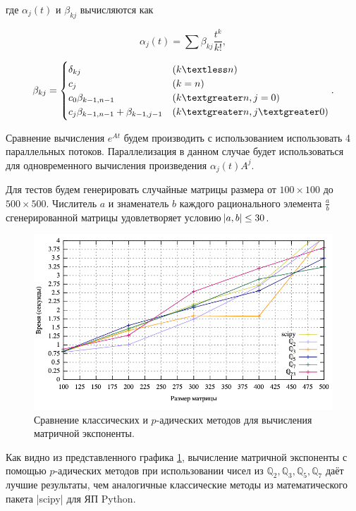 \documentclass[master, och, diploma, times]{sty/SCWorks}
\theoremstyle{plain}
\theoremstyle{definition}
\numberwithin{equation}{section}
\begin{document}
\noindent где $\alpha_{j}(t)$ и $\beta_{kj}$ вычисляются как

\begin{equation}
\alpha_{j}(t)=\sum \beta_{kj} \frac{t^k}{k!},
\end{equation}

\begin{equation}
\beta_{kj} = \begin{cases}
\delta_{kj} & (k \textless n) \\
c_j & (k = n) \\
c_0 \beta_{k-1,n-1} & (k \textgreater n, j=0) \\
c_j \beta_{k-1,n-1}+\beta_{k-1,j-1} & (k \textgreater n, j \textgreater 0)
\end{cases}.
\end{equation}


Сравнение вычисления $e^{At}$ будем производить с использованием использовать 4 параллельных потоков. Параллелизация в данном случае будет использоваться для одновременного вычисления произведения $\alpha_{j}(t)A^j$.

Для тестов будем генерировать случайные матрицы размера от \mbox{$100 \times 100$} до \mbox{$500 \times 500$}. Числитель $a$ и знаменатель $b$ каждого рационального элемента $\frac{a}{b}$ сгенерированной матрицы удовлетворяет условию $\abs{a,b} \leq 30$.

\begin{figure}[H]
\centerline{\includegraphics[width=0.85\linewidth]{../gnuplot/exp/plot.png}}
\caption{Сравнение классических и $p$-адических методов для вычисления матричной экспоненты.}
\label{img:exp:plot}
\end{figure}

Как видно из представленного графика \ref{img:exp:plot}, вычисление матричной экспоненты с помощью $p$-адических методов при использовании чисел из $\mathbb{Q}_2, \mathbb{Q}_3, \mathbb{Q}_5, \mathbb{Q}_7$ даёт лучшие результаты, чем аналогичные классические методы из математического пакета |scipy| для ЯП Python.
\end{document}
